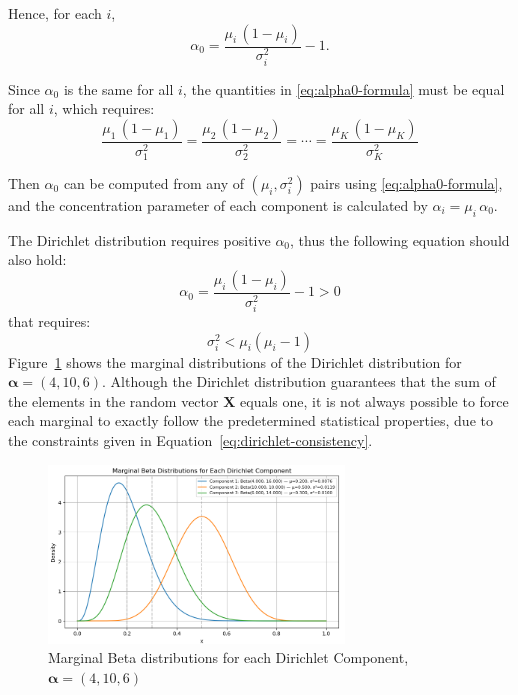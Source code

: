 \documentclass[12pt,a4paper]{article}
\begin{document}
	Hence, for each $i$,
	\begin{equation}
		\alpha_0 = \frac{\mu_i \, (1 - \mu_i)}{\sigma_i^2} - 1. \label{eq:alpha0-formula}
	\end{equation}

	Since $\alpha_0$ is the same for all $i$, the quantities in \eqref{eq:alpha0-formula} must be equal for all $i$, which requires:
	\begin{equation}
		\frac{\mu_1 \, (1 - \mu_1)}{\sigma_1^2}
		= \frac{\mu_2 \, (1 - \mu_2)}{\sigma_2^2}
		= \cdots
		= \frac{\mu_K \, (1 - \mu_K)}{\sigma_K^2}
		\label{eq:dirichlet-consistency}
	\end{equation}


	Then $\alpha_0$ can be computed from any of $(\mu_i,\sigma_i^2)$ pairs using \eqref{eq:alpha0-formula}, and the concentration parameter of each component is calculated by $\alpha_i = \mu_i \, \alpha_0$.
	
	The Dirichlet distribution requires positive $\alpha_0$, thus the following equation should also hold:
		\begin{equation}
		\alpha_0 = \frac{\mu_i \, (1 - \mu_i)}{\sigma_i^2} - 1 > 0 \label{eq:alpha0-formula2}
		\end{equation}
	that requires:
	\begin{equation}
		\sigma_i^2 < \mu_i(\mu_i-1) \label{eq:dirichlet-consistency2}
	\end{equation}
	Figure~\ref{fig:beta-mixture} shows the marginal distributions of the Dirichlet distribution for $\boldsymbol{\alpha} = (4, 10, 6)$. Although the Dirichlet distribution guarantees that the sum of the elements in the random vector $\mathbf{X}$ equals one, it is not always possible to force each marginal to exactly follow the predetermined statistical properties, due to the constraints given in Equation~\ref{eq:dirichlet-consistency}. 

	
		
	\begin{figure}[h!]
		\centering
		\includegraphics[width=0.7\textwidth]{BetaMixture.png}
		\caption{Marginal Beta distributions for each Dirichlet Component, $\boldsymbol{\alpha}=(4,10,6)$}
		\label{fig:beta-mixture}
	\end{figure}
\end{document}
